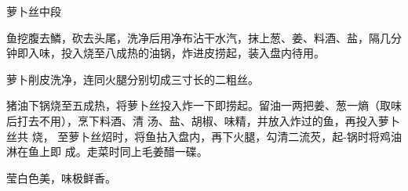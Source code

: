 \begin{recipe}[银丝中段]{萝卜丝中段}

\ingredients


\preparation

\step 鱼挖腹去鱗，砍去头尾，洗净后用净布沾干水汽，抹上葱、姜、料酒、盐，隔几分
钟即入味，投入烧至八成热的油锅，炸进皮捞起，装入盘内待用。

\step 萝卜削皮洗净，连同火腿分别切成三寸长的二粗丝。

\step 猪油下锅烧至五成热，将萝卜丝投入炸一下即捞起。留油一两把姜、葱一熵（取味
后打去不用），烹下料酒、清 汤、盐、胡椒、味精，并放入炸过的鱼，再投入萝卜丝共
烧， 至萝卜丝炤时，将鱼拈入盘内，再下火腿，勾清二流芡，起-锅时将鸡油淋在鱼上即
成。走菜时同上毛姜醋一碟。

\features

莹白色美，味极鲜香。

\end{recipe}

